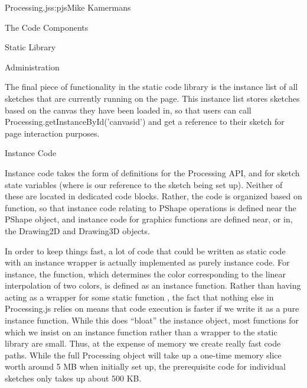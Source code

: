 \begin{aosachapter}{Processing.js}{s:pjs}{Mike Kamermans}
\begin{aosasect1}{The Code Components}
\begin{aosasect2}{Static Library}
\begin{aosaitemize}
\end{aosaitemize}

\end{aosasect2}

\begin{aosasect2}{Administration}

The final piece of functionality in the static code library is the
instance list of all sketches that are currently running on the
page. This instance list stores sketches based on the canvas they have
been loaded in, so that users can call
Processing.getInstanceById('canvasid') and get a reference to their
sketch for page interaction purposes.

\begin{aosasect3}{Instance Code}

Instance code takes the form of 
definitions for the Processing API, and  for sketch
state variables (where  is our reference to the sketch being set
up). Neither of these are located in dedicated code blocks. Rather,
the code is organized based on function, so that instance code
relating to PShape operations is defined near the PShape object, and
instance code for graphics functions are defined near, or in, the
Drawing2D and Drawing3D objects.

In order to keep things fast, a lot of code that could be written as
static code with an instance wrapper is actually implemented as purely
instance code. For instance, the  function,
which determines the color corresponding to the linear interpolation
of two colors, is defined as an instance function. Rather than having
 acting as a wrapper for some static function
, the fact that nothing else in
Processing.js relies on  means that code execution is
faster if we write it as a pure instance function. While this does
``bloat'' the instance object, most functions for which we insist on an
instance function rather than a wrapper to the static library are
small. Thus, at the expense of memory we create really fast code
paths. While the full Processing object will take up a one-time memory
slice worth around 5 MB when initially set up, the prerequisite code
for individual sketches only takes up about 500 KB.

\end{aosasect3}

\end{aosasect2}


\end{aosasect1}
\end{aosachapter}
